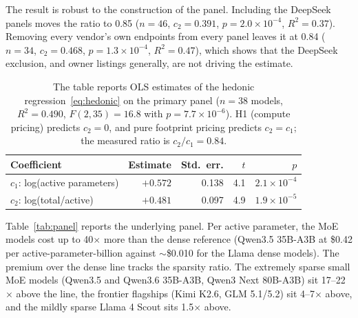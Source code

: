 \documentclass[11pt]{article}
\begin{document}
The result is robust to the construction of the panel. Including the
DeepSeek panels moves the ratio to 0.85 ($n = 46$, $c_2 = 0.391$,
$p = 2.0 \times 10^{-4}$, $R^2 = 0.37$). Removing every vendor's own
endpoints from every panel leaves it at 0.84 ($n = 34$, $c_2 = 0.468$,
$p = 1.3 \times 10^{-4}$, $R^2 = 0.47$), which shows that the DeepSeek
exclusion, and owner listings generally, are not driving the estimate.

\begin{table}[t]
\centering
\caption{The table reports OLS estimates of the hedonic
regression~\eqref{eq:hedonic} on the primary panel ($n = 38$ models,
$R^2 = 0.490$, $F(2,35) = 16.8$ with $p = 7.7 \times 10^{-6}$). H1 (compute
pricing) predicts $c_2 = 0$, and pure footprint pricing predicts
$c_2 = c_1$; the measured ratio is $c_2/c_1 = 0.84$.}
\label{tab:ols}
\begin{tabular}{lrrrr}
\toprule
Coefficient & Estimate & Std.\ err. & $t$ & $p$ \\
\midrule
$c_1$: log(active parameters) & $+0.572$ & 0.138 & 4.1 & $2.1 \times 10^{-4}$ \\
$c_2$: log(total/active)      & $+0.481$ & 0.097 & 4.9 & $1.9 \times 10^{-5}$ \\
\bottomrule
\end{tabular}
\end{table}

Table~\ref{tab:panel} reports the underlying panel. Per active parameter,
the MoE models cost up to 40$\times$ more than the dense reference (Qwen3.5
35B-A3B at \$0.42 per active-parameter-billion against $\sim$\$0.010 for the
Llama dense models). The premium over the dense line tracks the sparsity
ratio. The extremely sparse small MoE models (Qwen3.5 and Qwen3.6 35B-A3B,
Qwen3 Next 80B-A3B) sit 17--22$\times$ above the line, the frontier
flagships (Kimi K2.6, GLM 5.1/5.2) sit 4--7$\times$ above, and the mildly
sparse Llama 4 Scout sits 1.5$\times$ above.
\end{document}
